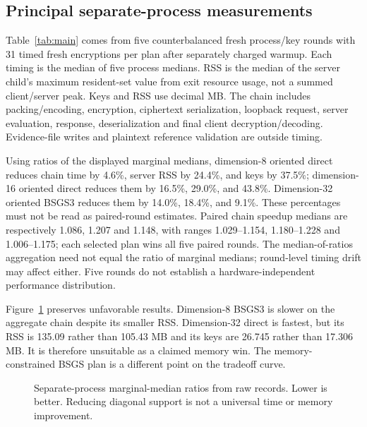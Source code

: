 \documentclass[10pt]{article}
\begin{document}
\subsection{Principal separate-process measurements}\label{sec:primary}
Table~\ref{tab:main} comes from five counterbalanced fresh process/key rounds with 31 timed fresh encryptions per plan after separately charged warmup. Each timing is the median of five process medians. RSS is the median of the server child's maximum resident-set value from exit resource usage, not a summed client/server peak. Keys and RSS use decimal MB. The chain includes packing/encoding, encryption, ciphertext serialization, loopback request, server evaluation, response, deserialization and final client decryption/decoding. Evidence-file writes and plaintext reference validation are outside timing.

\begin{table}[t]
\centering\small
\resizebox{\linewidth}{!}{}
\caption{Actual separate client/server processes, $B=128$. Setup is charged separately from the recurring chain. All plans use identical final parameters and quality requirements.}\label{tab:main}
\end{table}

Using ratios of the displayed marginal medians, dimension-8 oriented direct reduces chain time by 4.6\%, server RSS by 24.4\%, and keys by 37.5\%; dimension-16 oriented direct reduces them by 16.5\%, 29.0\%, and 43.8\%. Dimension-32 oriented BSGS3 reduces them by 14.0\%, 18.4\%, and 9.1\%. These percentages must not be read as paired-round estimates. Paired chain speedup medians are respectively 1.086, 1.207 and 1.148, with ranges 1.029--1.154, 1.180--1.228 and 1.006--1.175; each selected plan wins all five paired rounds. The median-of-ratios aggregation need not equal the ratio of marginal medians; round-level timing drift may affect either. Five rounds do not establish a hardware-independent performance distribution.

Figure~\ref{fig:tradeoffs} preserves unfavorable results. Dimension-8 BSGS3 is slower on the aggregate chain despite its smaller RSS. Dimension-32 direct is fastest, but its RSS is 135.09 rather than 105.43 MB and its keys are 26.745 rather than 17.306 MB. It is therefore unsuitable as a claimed memory win. The memory-constrained BSGS plan is a different point on the tradeoff curve.

\begin{figure}[t]\centering

\caption{Separate-process marginal-median ratios from raw records. Lower is better. Reducing diagonal support is not a universal time or memory improvement.}\label{fig:tradeoffs}
\end{figure}
\end{document}
